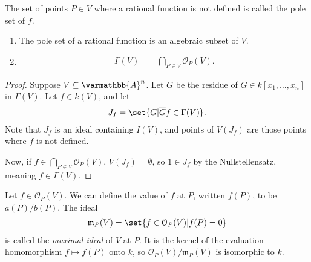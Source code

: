 \documentclass[10pt]{mypackage}
\renewcommand*{\mathbb}[1]{\varmathbb{#1}}
\newcommand{\A}{\mathbb{A}}
\begin{document}
The set of points $P\in V$ where a rational function is not defined is called the pole set of $f$.
\begin{proposition}\hfill
  \begin{enumerate}[(1)]
    \item The pole set of a rational function is an algebraic subset of $V$.
    \item 
      \begin{align*}
        \Gamma\left( V \right) &= \bigcap_{P\in V}\mathcal{O}_{P}\left( V \right).
      \end{align*}
  \end{enumerate}
\end{proposition}
\begin{proof}
  Suppose $V\subseteq \A^n$. Let $ \overline{G} $ be the residue of $G\in k\left[ x_1,\dots,x_n \right]$ in $\Gamma(V)$. Let $f\in k(V)$, and let
  \begin{align*}
     J_f= \set{G | \overline{G}f\in \Gamma(V)}.
  \end{align*}
  Note that $J_f$ is an ideal containing $I(V)$, and points of $V\left(J_f\right)$ are those points where $f$ is not defined.\newline

  Now, if $f\in \bigcap_{P\in V}\mathcal{O}_P\left( V \right)$, $V\left(J_f\right) = \emptyset$, so $1\in J_f$ by the Nullstellensatz, meaning $f\in \Gamma(V)$.
\end{proof}
Let $f\in \mathcal{O}_P\left( V \right)$. We can define the value of $f$ at $P$, written $f(P)$, to be $a(P)/b(P)$. The ideal 
\begin{align*}
  \mathfrak{m}_P(V) = \set{f\in \mathcal{O}_P(V) | f(P) = 0}
\end{align*}
is called the \textit{maximal ideal} of $V$ at $P$. It is the kernel of the evaluation homomorphism $f\mapsto f(P)$ onto $k$, so $\mathcal{O}_P(V)/\mathfrak{m}_P(V)$ is isomorphic to $k$.\newline
\end{document}
